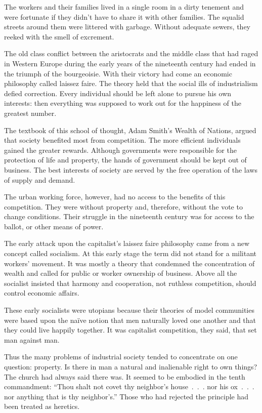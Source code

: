 The workers and their families lived in a single room in a dirty tenement and were fortunate if they
didn’t have to share it with other families. The squalid streets around them were littered with
garbage. Without adequate sewers, they reeked with the smell of excrement.

The old class conflict between the aristocrats and the middle class that had raged in Western Europe
during the early years of the nineteenth century had ended in the triumph of the bourgeoisie. With
their victory had come an economic philosophy called laissez faire. The theory held that the social
ills of industrialism defied correction. Every individual should be left alone to pursue his own
interests: then everything was supposed to work out for the happiness of the greatest number.

The textbook of this school of thought, Adam Smith’s Wealth of Nations, argued that society
benefited most from competition. The more efficient individuals gained the greater rewards. Although
governments were responsible for the protection of life and property, the hands of government should
be kept out of business. The best interests of society are served by the free operation of the laws
of supply and demand.

The urban working force, however, had no access to the benefits of this competition. They were
without property and, therefore, without the vote to change conditions. Their struggle in the
nineteenth century was for access to the ballot, or other means of power.

The early attack upon the capitalist’s laissez faire philosophy came from a new concept called
socialism. At this early stage the term did not stand for a militant workers’ movement. It was
mostly a theory that condemned the concentration of wealth and called for public or worker ownership
of business. Above all the socialist insisted that harmony and cooperation, not ruthless
competition, should control economic affairs.

These early socialists were utopians because their theories of model communities were based upon the
naïve notion that men naturally loved one another and that they could live happily together. It was
capitalist competition, they said, that set man against man.

Thus the many problems of industrial society tended to concentrate on one question: property. Is
there in man a natural and inalienable right to own things? The church had always said there was. It
seemed to be embodied in the tenth commandment: “Thou shalt not covet thy neighbor’s house~.~.~. nor
his ox~.~.~. nor anything that is thy neighbor’s.” Those who had rejected the principle had been
treated as heretics.

